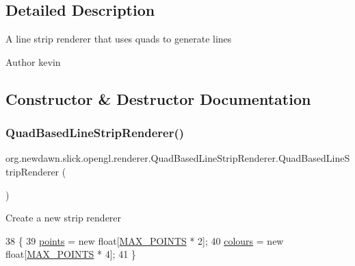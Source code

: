 \subsection{Detailed Description}
A line strip renderer that uses quads to generate lines

\begin{DoxyAuthor}{Author}
kevin 
\end{DoxyAuthor}


\subsection{Constructor \& Destructor Documentation}
\mbox{\label{classorg_1_1newdawn_1_1slick_1_1opengl_1_1renderer_1_1_quad_based_line_strip_renderer_aaa72b9907ffda26fc5c047123457deb9}} 
\subsubsection{\texorpdfstring{Quad\+Based\+Line\+Strip\+Renderer()}{QuadBasedLineStripRenderer()}}
{\footnotesize\ttfamily org.\+newdawn.\+slick.\+opengl.\+renderer.\+Quad\+Based\+Line\+Strip\+Renderer.\+Quad\+Based\+Line\+Strip\+Renderer (\begin{DoxyParamCaption}{ }\end{DoxyParamCaption})\hspace{0.3cm}{\ttfamily [inline]}}

Create a new strip renderer 
\begin{DoxyCode}
38                                         \{
39         \mbox{\hyperlink{classorg_1_1newdawn_1_1slick_1_1opengl_1_1renderer_1_1_quad_based_line_strip_renderer_adeb4716a8ddb005cec7c3cc2ed9042e3}{points}} = \textcolor{keyword}{new} \textcolor{keywordtype}{float}[\mbox{\hyperlink{classorg_1_1newdawn_1_1slick_1_1opengl_1_1renderer_1_1_quad_based_line_strip_renderer_a38b76f8ae2fbd9df9da795a0bfcd68cb}{MAX\_POINTS}} * 2];
40         \mbox{\hyperlink{classorg_1_1newdawn_1_1slick_1_1opengl_1_1renderer_1_1_quad_based_line_strip_renderer_a24d42d1121b6b8a54d57edd8e972bfd0}{colours}} = \textcolor{keyword}{new} \textcolor{keywordtype}{float}[\mbox{\hyperlink{classorg_1_1newdawn_1_1slick_1_1opengl_1_1renderer_1_1_quad_based_line_strip_renderer_a38b76f8ae2fbd9df9da795a0bfcd68cb}{MAX\_POINTS}} * 4];
41     \}
\end{DoxyCode}


